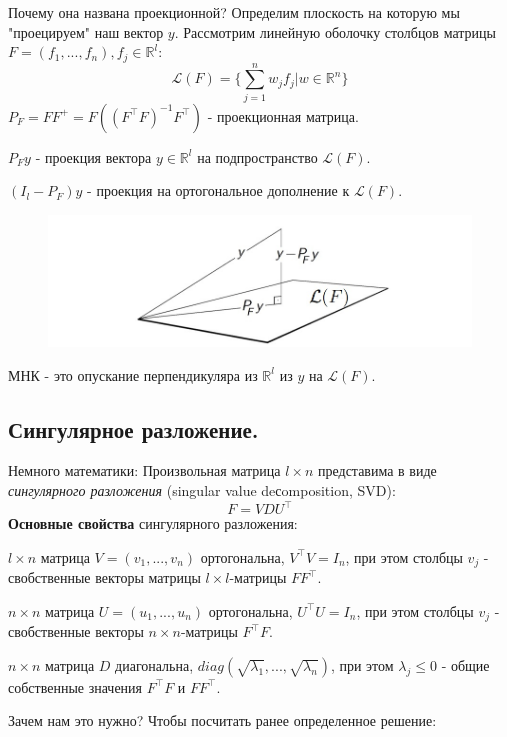 Почему она названа проекционной? Определим плоскость на которую мы "проецируем" наш вектор $y$.
Рассмотрим линейную оболочку столбцов матрицы $F = (f_1, ..., f_n), f_j \in \mathbb{R}^l$:
$$\mathcal{L}(F) = \{ \sum_{j = 1}^n w_jf_j| w \in \mathbb{R}^n\}$$
$P_F = FF^+ = F((F^\top F)^{-1}F^\top)$ - проекционная матрица.

$P_Fy$ - проекция вектора $y \in \mathbb{R}^l$ на подпространство $\mathcal{L}(F)$.

$(I_l - P_F)y$ - проекция на ортогональное дополнение к $\mathcal{L}(F)$.

\begin{figure}[h]
  \centering
  \includegraphics[scale=0.7]{chapters/general_linear/pictures/pic.jpg}
\end{figure}

МНК - это опускание перпендикуляра из $\mathbb{R}^l$ из $y$ на $\mathcal{L}(F)$.

\subsection*{Сингулярное разложение.}

Немного математики:
Произвольная матрица $l \times n$ представима в виде \textit{сингулярного разложения}  (singular value deсomposition, SVD):
$$F = VDU^\top$$
\noindent\textbf{Основные свойства} сингулярного разложения:

$l \times n$ матрица $V = (v_1, ..., v_n)$ ортогональна, $V^\top V = I_n$, при этом столбцы $v_j$ - свобственные векторы матрицы $l \times l$-матрицы $FF^\top$.

$n \times n$ матрица $U = (u_1, ..., u_n)$ ортогональна, $U^\top U = I_n$, при этом столбцы $v_j$ - свобственные векторы $n \times n$-матрицы $F^\top F$.

$n \times n$ матрица $D$ диагональна, $diag(\sqrt{\lambda_1}, ..., \sqrt{\lambda_n})$, при этом $\lambda_j \leq 0$ - общие собственные значения $F^\top F$ и $FF^\top$.

Зачем нам это нужно? Чтобы посчитать ранее определенное решение:

